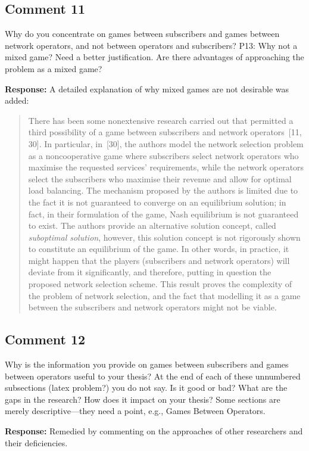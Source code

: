 \documentclass[10pt,a4paper,notitlepage]{article}
\numberwithin{equation}{section}
\begin{document}
\subsection{Comment 11}
Why do you concentrate on games between subscribers and games between network operators, and not between operators and subscribers? P13: Why not a mixed game? Need a better justification. Are there advantages of approaching the problem as a mixed game?

\textbf{Response:}
A detailed explanation of why mixed games are not desirable was added:
\begin{quote}
There has been some nonextensive research carried out that permitted a third possibility of a game between subscribers and network operators~[11, 30]. In particular, in~[30], the authors model the network selection problem as a noncooperative game where subscribers select network operators who maximise the requested services' requirements, while the network operators select the subscribers who maximise their revenue and allow for optimal load balancing. The mechanism proposed by the authors is limited due to the fact it is not guaranteed to converge on an equilibrium solution; in fact, in their formulation of the game, Nash equilibrium is not guaranteed to exist. The authors provide an alternative solution concept, called \emph{suboptimal solution}, however, this solution concept is not rigorously shown to constitute an equilibrium of the game. In other words, in practice, it might happen that the players (subscribers and network operators) will deviate from it significantly, and therefore, putting in question the proposed network selection scheme. This result proves the complexity of the problem of network selection, and the fact that modelling it as a game between the subscribers and network operators might not be viable.
\end{quote}

\subsection{Comment 12}
Why is the information you provide on games between subscribers and games between operators useful to your thesis? At the end of each of these unnumbered subsections (latex problem?) you do not say. Is it good or bad? What are the gaps in the research? How does it impact on your thesis? Some sections are merely descriptive---they need a point, e.g., Games Between Operators.

\textbf{Response:}
Remedied by commenting on the approaches of other researchers and their deficiencies.
\end{document}
